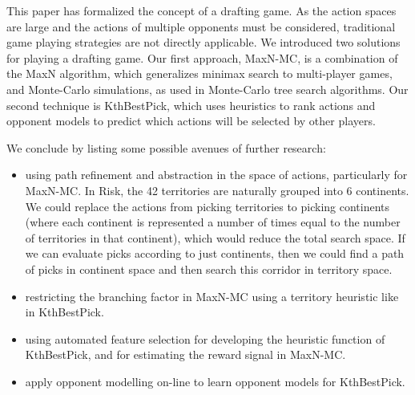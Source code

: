 \documentclass[letterpaper]{article}
\numberwithin{equation}{section}
\numberwithin{theorem}{section}
\numberwithin{lemma}{section}
\numberwithin{df}{section}
\begin{document}

This paper has formalized the concept of a drafting game.  As the action spaces are large and the actions of multiple opponents must be considered, traditional game playing strategies are not directly applicable.  We introduced two solutions for playing a drafting game.  Our first approach, MaxN-MC, is a combination of the MaxN algorithm, which generalizes minimax search to multi-player games, and Monte-Carlo simulations, as used in Monte-Carlo tree search algorithms.  Our second technique is KthBestPick, which uses heuristics to rank actions and opponent models to predict which actions will be selected by other players.  

We conclude by listing some possible avenues of further research:
\begin{itemize}
	\item using path refinement and abstraction in the space of actions, particularly for MaxN-MC.  In Risk, the 42 territories are naturally grouped into 6 continents.  We could replace the actions from picking territories to picking continents (where each continent is represented a number of times equal to the number of territories in that continent), which would reduce the total search space.  If we can evaluate picks according to just continents, then we could find a path of picks in continent space and then search this corridor in territory space.
	\item restricting the branching factor in MaxN-MC using a territory heuristic like in KthBestPick.
	\item using automated feature selection for developing the heuristic function of KthBestPick, and for estimating the reward signal in MaxN-MC.
	\item apply opponent modelling on-line to learn opponent models for KthBestPick.
\end{itemize}

%
%

%
%


\end{document}
